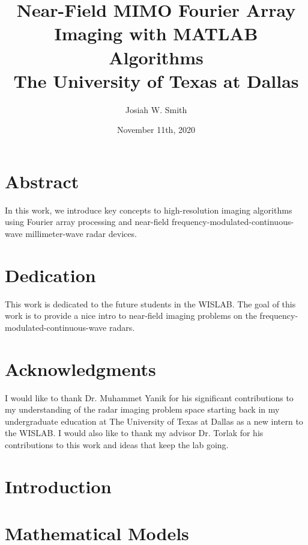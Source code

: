 \documentclass[12pt]{report}
\title{
	{Near-Field MIMO Fourier Array Imaging with MATLAB Algorithms}\\
	{\large The University of Texas at Dallas}\\
	
}
\author{Josiah W. Smith}
\date{November 11th, 2020}
\begin{document}
	
\maketitle

\chapter*{Abstract}
In this work, we introduce key concepts to high-resolution imaging algorithms using Fourier array processing and near-field frequency-modulated-continuous-wave millimeter-wave radar devices. 

\chapter*{Dedication}
This work is dedicated to the future students in the WISLAB. The goal of this work is to provide a nice intro to near-field imaging problems on the frequency-modulated-continuous-wave radars. 

\chapter*{Acknowledgments}
I would like to thank Dr. Muhammet Yanik for his significant contributions to my understanding of the radar imaging problem space starting back in my undergraduate education at The University of Texas at Dallas as a new intern to the WISLAB. I would also like to thank my advisor Dr. Torlak for his contributions to this work and ideas that keep the lab going.

\tableofcontents

\chapter{Introduction}


\chapter{Mathematical Models}

\end{document}
